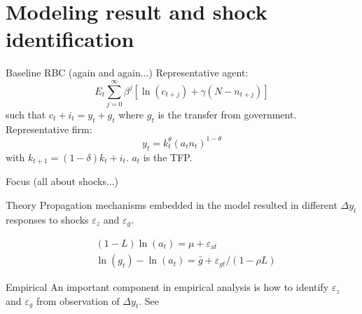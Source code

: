 \documentclass[10pt]{beamer}
\begin{document}
\section{Modeling result and shock identification}

\begin{frame}{Baseline RBC (again and again...)}
    Representative agent:
    \begin{equation}
        E_{t} \sum_{j=0}^{\infty} \beta^{j} \left[\ln (c_{t+j})+\gamma(N-n_{t+j})\right]
    \end{equation}
    such that $c_t + i_t = y_t + g_t$  where \alert{$g_t$} is the transfer from government.\\
    Representative firm:
    \begin{equation}
        y_t = k_t^{\theta} (a_t n_t)^{1-\theta}
    \end{equation}
    with $k_{t+1} = (1-\delta) k_t + i_t$. \alert{$a_t$} is the TFP. \\[1em]

\end{frame}

\begin{frame}{Focus (all about shocks...)}
    \begin{exampleblock}{Theory}
        Propagation mechanisms embedded in the model resulted in different $\Delta y_t$ responses to shocks $\varepsilon_z$ and $\varepsilon_g$.
    \end{exampleblock}
    \begin{align}
         & (1-L) \ln \left(a_{t}\right)=\mu+\varepsilon_{\mathrm{a} t}                         \\
         & \ln \left(g_{t}\right)-\ln \left(a_{t}\right)=\bar{g}+\varepsilon_{g t} /(1-\rho L)
    \end{align}

    \begin{exampleblock}{Empirical}
        An important component in empirical analysis is how to identify $\varepsilon_z$ and $\varepsilon_g$ from observation of $\Delta y_t$. See \cite{blanchard_quah_1988}
    \end{exampleblock}
\end{frame}
\end{document}
